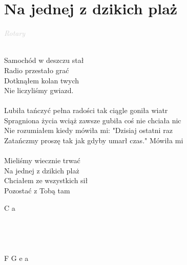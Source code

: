 \documentclass[a5paper, 10pt]{book}
\begin{document}
\section{Na jednej z dzikich plaż}\textcolor{lightgray}{\textit{Rotary}}\\~\\
\begin{minipage}[t]{0.8\textwidth}
  Samochód w deszczu stał\\
  Radio przestało grać\\
  Dotknąłem kolan twych\\
  Nie liczyliśmy gwiazd.\\
  \\
  \hspace*{5mm}Lubiła tańczyć pełna radości tak ciągle goniła wiatr\\
  \hspace*{5mm}Spragniona życia wciąż zawsze gubiła coś nie chciała nic\\
  \hspace*{5mm}Nie rozumiałem kiedy mówiła mi: "Dzisiaj ostatni raz\\
  \hspace*{5mm}Zatańczmy proszę tak jak gdyby umarł czas." Mówiła mi\\
  \\
  Mieliśmy wiecznie trwać\\
  Na jednej z dzikich plaż\\
  Chciałem ze wszystkich sił\\
  Pozostać z Tobą tam\\
\end{minipage}
\begin{minipage}[t]{0.2\textwidth}
  C a\\
  ~\\
  ~\\
  ~\\
  ~\\
  F G e a\\
\end{minipage}

\newpage
\end{document}
